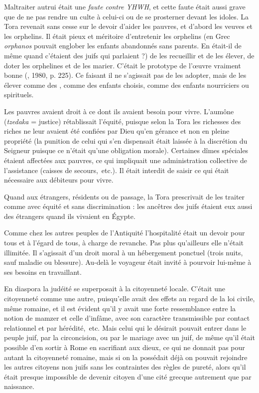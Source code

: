  Maltraiter autrui était une \emph{faute contre YHWH}, et cette faute était aussi grave que de ne pas rendre un culte à celui-ci ou de se prosterner devant les idoles. La Tora revenait sans cesse sur le devoir d'aider les pauvres, et d'abord les veuves et les orphelins. Il était pieux et méritoire d'entretenir les orphelins (en Grec \emph{orphanos} pouvait englober les enfants abandonnés sans parents. En était-il de même quand c'étaient des juifs qui parlaient ?) de les recueillir et de les élever, de doter les orphelines et de les marier. C'était le prototype de l'œuvre vraiment bonne (, 1980, p. 225). Ce faisant il ne s'agissait pas de les adopter, mais de les élever comme des , comme des enfants choisis, comme des enfants nourriciers ou spirituels. 

 Les pauvres avaient droit à ce dont ils avaient besoin pour vivre. L'aumône (\emph{tzedaka} = justice) rétablissait l'équité, puisque selon la Tora les richesses des riches ne leur avaient été confiées par Dieu qu'en gérance et non en pleine propriété (la punition de celui qui s'en dispensait était laissée à la discrétion du Seigneur puisque ce n'était qu'une obligation morale). Certaines dîmes spéciales étaient affectées aux pauvres, ce qui impliquait une administration collective de l'assistance (caisses de secours,~etc.). Il était interdit de saisir ce qui était nécessaire aux débiteurs pour vivre. 

 Quand aux étrangers, résidents ou de passage, la Tora prescrivait de les traiter comme avec équité et sans discrimination : les ancêtres des juifs étaient eux aussi des étrangers quand ils vivaient en Égypte. 

 Comme chez les autres peuples de l'Antiquité l'hospitalité était un devoir pour tous et à l'égard de tous, à charge de revanche. Pas plus qu'ailleurs elle n'était illimitée. Il s'agissait d'un droit moral à un hébergement ponctuel (trois nuits, sauf maladie ou blessure). Au-delà le voyageur était invité à pourvoir lui-même à ses besoins en travaillant. 

 En diaspora la judéité se superposait à la citoyenneté locale. C'était une citoyenneté comme une autre, puisqu'elle avait des effets au regard de la loi civile, même romaine, et il est évident qu'il y avait une forte ressemblance entre la notion de mamzer et celle d'infâme, avec son caractère transmissible par contact relationnel et par hérédité,~etc. Mais celui qui le désirait pouvait entrer dans le peuple juif, par la circoncision, ou par le mariage avec un juif, de même qu'il était possible d'en sortir à Rome en sacrifiant aux dieux, ce qui ne donnait pas pour autant la citoyenneté romaine, mais si on la possédait déjà on pouvait rejoindre les autres citoyens non juifs sans les contraintes des règles de pureté, alors qu'il était presque impossible de devenir citoyen d'une cité grecque autrement que par naissance.


